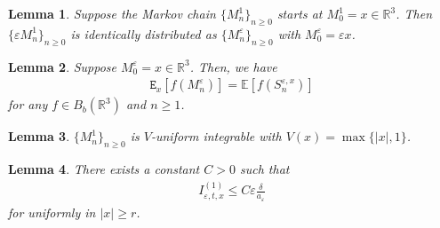 \documentclass[10pt,a4paper]{amsart}
\newtheorem{lemma}{Lemma}
\newcommand{\R}{{\mathbb{R}}}
\newcommand{\e}{\varepsilon}
\begin{document}
\begin{lemma}\label{lem:scalingMCM}
Suppose the Markov chain $\{M_n^1\}_{n\geq 0}$ starts at $M_0^1=x\in \R^3$. Then $\{\e M_n^1\}_{n\geq 0}$ is identically distributed as $\{M_n^\e\}_{n\geq 0}$ with $M_0^\e=\e x$.

\end{lemma}

\begin{lemma}\label{lem:MScorr}
Suppose  $M_0^{\e}=x\in \R^3$. Then, we have \begin{align*}
\mathtt{E}_x\left[f\left(M_n^\e\right)\right]=\mathbb{E}\left[f\left(S_n^{\e,x}\right)\right]
\end{align*}
for any $f\in B_b(\R^3)$ and $n\geq 1$. 
\end{lemma}

\begin{lemma}\label{lem:VuniGeoMe}
$\{M_n^1\}_{n\geq 0}$ is $V$-uniform integrable with $V(x)=\max\{|x|,1\}$.
\end{lemma}

\begin{lemma}\label{lem:I1estimate}
There exists a constant $C>0$ such that \begin{align*}
I_{\e,t,x}^{(1)}\leq C\e \frac{\delta}{a_\e}
\end{align*}
for uniformly in $|x|\geq r$.
\end{lemma}
\end{document}
